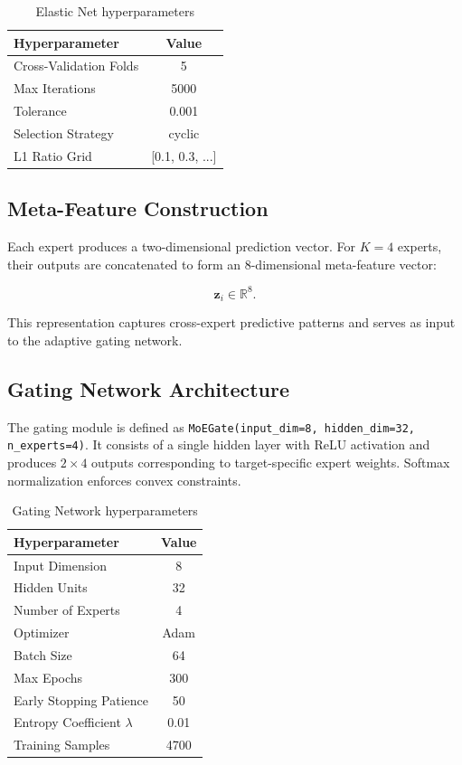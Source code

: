 \documentclass{customIEEEsingle}
\begin{document}
	\begin{table}[htbp]
		\centering
		\caption{Elastic Net hyperparameters}
		\label{tab:enet_params}
		\begin{tabular}{|l|c|}
			\hline
			Hyperparameter & Value \\
			\hline
			Cross-Validation Folds & 5 \\
			Max Iterations & 5000 \\
			Tolerance & 0.001 \\
			Selection Strategy & cyclic \\
			L1 Ratio Grid & [0.1, 0.3, ...] \\
			\hline
		\end{tabular}
	\end{table}
	
	\subsection{Meta-Feature Construction}
	
	Each expert produces a two-dimensional prediction vector. For $K=4$ experts, their outputs are concatenated to form an 8-dimensional meta-feature vector:
	
	\[
	\mathbf{z}_i \in \mathbb{R}^{8}.
	\]
	
	This representation captures cross-expert predictive patterns and serves as input to the adaptive gating network.
	
	\subsection{Gating Network Architecture}
	
	The gating module is defined as \texttt{MoEGate(input\_dim=8, hidden\_dim=32, n\_experts=4)}. It consists of a single hidden layer with ReLU activation and produces $2 \times 4$ outputs corresponding to target-specific expert weights. Softmax normalization enforces convex constraints.
	
	\begin{table}[H]
		\centering
		\caption{Gating Network hyperparameters}
		\label{tab:gating_params}
		\begin{tabular}{|l|c|}
			\hline
			Hyperparameter & Value \\
			\hline
			Input Dimension & 8 \\
			Hidden Units & 32 \\
			Number of Experts & 4 \\
			Optimizer & Adam \\
			Batch Size & 64 \\
			Max Epochs & 300 \\
			Early Stopping Patience & 50 \\
			Entropy Coefficient $\lambda$ & 0.01 \\
			Training Samples & 4700 \\
			\hline
		\end{tabular}
	\end{table}
	
\end{document}
